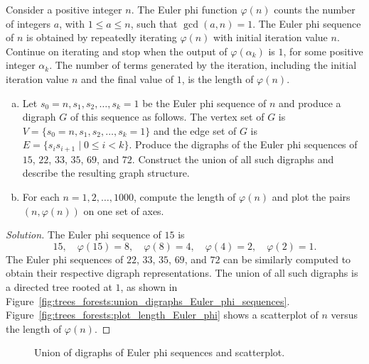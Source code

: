 \begin{example}
\label{eg:trees_forests:Euler_phi_function_tree}
Consider a positive integer $n$. The Euler
phi function
$\varphi(n)$ counts the number of integers $a$,
with $1 \leq a \leq n$, such that $\gcd(a,n) = 1$. The Euler phi
sequence of $n$ is obtained by repeatedly
iterating $\varphi(n)$ with initial iteration value $n$. Continue on
iterating and stop when the output of $\varphi(\alpha_k)$ is $1$, for
some positive integer $\alpha_k$. The number of terms generated by the
iteration, including the initial iteration value $n$ and the final
value of $1$, is the length of $\varphi(n)$.
\begin{enumerate}[(a)]
\item Let $s_0=n, s_1, s_2, \dots, s_k=1$ be the Euler phi
  sequence of $n$ and produce a digraph $G$
  of this sequence as follows. The vertex set of $G$ is
  $V = \{s_0=n, s_1, s_2, \dots, s_k=1\}$ and the edge set of $G$ is
  $E = \{s_i s_{i+1} \mid 0 \leq i < k\}$. Produce the digraphs of the
  Euler phi sequences of $15$, $22$, $33$,
  $35$, $69$, and $72$. Construct the union of
  all such digraphs and describe the resulting graph structure.

\item For each $n = 1, 2, \dots, 1000$, compute the length of
  $\varphi(n)$ and plot the pairs $(n, \varphi(n))$ on one set of axes.
\end{enumerate}
\end{example}

\begin{proof}[Solution]
The Euler phi sequence of $15$ is
\[
15,\quad
\varphi(15) = 8,\quad
\varphi(8) = 4,\quad
\varphi(4) = 2,\quad
\varphi(2) = 1.
\]
The Euler phi sequences of $22$, $33$, $35$,
$69$, and $72$ can be similarly computed to obtain their respective
digraph representations. The union of all such
digraphs is a directed tree rooted at $1$, as shown in
Figure~\ref{fig:trees_forests:union_digraphs_Euler_phi_sequences}.
Figure~\ref{fig:trees_forests:plot_length_Euler_phi} shows a
scatterplot of $n$ versus the length of
$\varphi(n)$.
\end{proof}

\begin{figure}[!htbp]
\centering
{}
\subfigure[]{
\label{fig:trees_forests:union_digraphs_Euler_phi_sequences}

}
\quad
\subfigure[]{
\label{fig:trees_forests:plot_length_Euler_phi}

}
\caption{Union of digraphs of Euler phi sequences and scatterplot.}
\label{fig:trees_forests:union_digraphs_scatterplot}
\end{figure}


